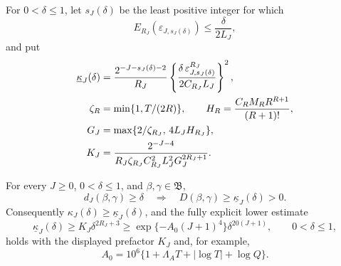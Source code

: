 For \(0<\delta\le1\), let \(s_J(\delta)\) be the least positive integer for
which
\begin{equation}
 E_{R_J}(\varepsilon_{J,s_J(\delta)})
 \le \frac{\delta}{2L_J},
 \label{eq:scale-choice}
\end{equation}
and put
\begin{align}
 \underline\kappa_J(\delta)
 &=\frac{2^{-J-s_J(\delta)-2}}{R_J}
 \left\{
   \frac{\delta\,\varepsilon_{J,s_J(\delta)}^{R_J}}
        {2C_{R_J}L_J}
 \right\}^2,
 \label{eq:effective-kappa}\\
 \zeta_R&=\min\{1,T/(2R)\},\qquad
 H_R=\frac{C_RM_RR^{R+1}}{(R+1)!},\notag\\
 G_J&=\max\{2/\zeta_{R_J},\,4L_JH_{R_J}\},\notag\\
 K_J&=\frac{2^{-J-4}}
 {R_J\zeta_{R_J}C_{R_J}^2L_J^2G_J^{2R_J+1}}.
 \label{eq:explicit-kappa-prefactor}
\end{align}

\begin{theorem}
\label{thm:effective-jacobi-stability}
For every \(J\ge0\), \(0<\delta\le1\), and
\(\beta,\gamma\in\mathfrak B\),
\begin{equation}
 d_J(\beta,\gamma)\ge\delta
 \quad\Longrightarrow\quad
 D(\beta,\gamma)\ge\underline\kappa_J(\delta)>0.
 \label{eq:effective-response-separation}
\end{equation}
Consequently \(\kappa_J(\delta)\ge\underline\kappa_J(\delta)\), and the
fully explicit lower estimate
\begin{equation}
 \underline\kappa_J(\delta)\ge K_J\delta^{2R_J+3}
 \ge \exp\{-A_0(J+1)^4\}\delta^{20(J+1)},
 \qquad 0<\delta\le1,
 \label{eq:kappa-asymptotic-lower}
\end{equation}
holds with the displayed prefactor \(K_J\) and, for example,
\begin{equation}
 A_0=10^6\{1+\Lambda_AT+|\log T|+\log Q\}.
 \label{eq:explicit-A0}
\end{equation}
\end{theorem}

